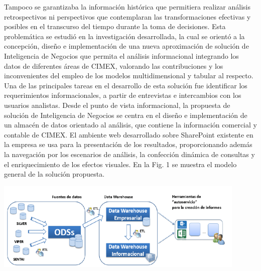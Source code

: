 \documentclass[preprint,12pt]{elsarticle}
\begin{document}
Tampoco  se  garantizaba  la información  histórica  que permitiera realizar análisis retrospectivos ni perspectivos que contemplaran las transformaciones efectivas y posibles en el transcurso del tiempo durante la toma de decisiones. Esta problemática se estudió en la investigación desarrollada,  la cual  se orientó  a la  concepción, diseño e implementación  de una  nueva aproximación de solución de Inteligencia de Negocios que permita el análisis informacional integrando los datos de diferentes áreas de CIMEX, valorando las contribuciones y los inconvenientes del empleo de los modelos multidimensional y tabular al respecto. Una de las principales tareas en el desarrollo de esta solución fue identificar los requerimientos informacionales, a partir de entrevistas e intercambios con los usuarios analistas.  Desde el punto de vista informacional, la propuesta de solución de Inteligencia de Negocios se centra en el diseño  e implementación de un  almacén de datos orientado al  análisis, que  contiene la información comercial y contable de CIMEX. El ambiente web desarrollado sobre SharePoint existente en la empresa se usa para la presentación de los resultados, proporcionando además la navegación por los escenarios de análisis, la confección dinámica de consultas y el enriquecimiento de los efectos visuales. En la Fig. 1 se muestra el modelo general de la solución propuesta.



\begin{center}
	\includegraphics[width=12cm]{./Imagenes/ang2} 
\end{center}
\end{document}
